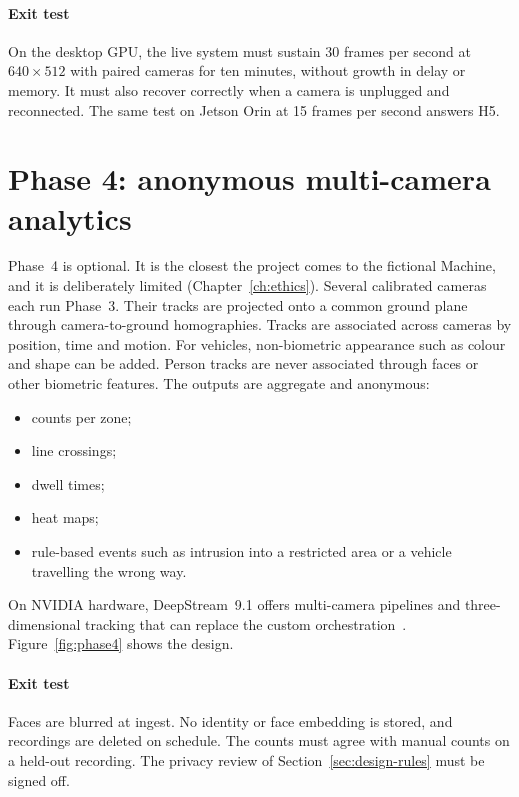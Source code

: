 \paragraph{Exit test}
On the desktop GPU, the live system must sustain 30 frames per second at
$640\times512$ with paired cameras for ten minutes, without growth in delay
or memory. It must also recover correctly when a camera is unplugged and
reconnected. The same test on Jetson Orin at 15 frames per second answers
H5.



\section{Phase 4: anonymous multi-camera analytics}
\label{sec:phase4}

Phase~4 is optional. It is the closest the project comes to the fictional
Machine, and it is deliberately limited (Chapter~\ref{ch:ethics}). Several
calibrated cameras each run Phase~3. Their tracks are projected onto a common
ground plane through camera-to-ground homographies. Tracks are associated
across cameras by position, time and motion. For vehicles, non-biometric
appearance such as colour and shape can be added. Person tracks are never
associated through faces or other biometric features. The outputs are
aggregate and anonymous:
\begin{itemize}
  \item counts per zone;
  \item line crossings;
  \item dwell times;
  \item heat maps;
  \item rule-based events such as intrusion into a restricted area or a
        vehicle travelling the wrong way.
\end{itemize}
On NVIDIA hardware, DeepStream~9.1 offers multi-camera pipelines and
three-dimensional tracking that can replace the custom
orchestration~\citep{deepstream_docs}. Figure~\ref{fig:phase4} shows the
design.

\paragraph{Exit test}
Faces are blurred at ingest. No identity or face embedding is stored, and
recordings are deleted on schedule. The counts must agree with manual
counts on a held-out recording. The privacy review of
Section~\ref{sec:design-rules} must be signed off.

